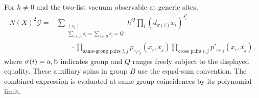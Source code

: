 \begin{theorem}\label{j:finite-spin-formula}
For $h\ne0$ and the two-list vacuum observable at generic sites,
\begin{equation}\label{j:finite-spin-sum}
\begin{aligned}
N(X)^2\mathscr G
 ={}&\sum_{\substack{(s_i)\\ \sum_{i\in A}s_i=\sum_{i\in B}s_i=Q}}
 h^Q \prod_i (d_{\sigma(i)}x_i)^{s_i^2}\\
 &\qquad\cdot\prod_{\text{same-group pairs }i,j}p_{s_i s_j}(x_i,x_j)
 \prod_{\text{cross pairs }i,j}p'_{s_i s_j}(x_i,x_j),
\end{aligned}
\end{equation}
where $\sigma(i)={\rm a},{\rm b}$ indicates group and $Q$ ranges freely
subject to the displayed equality. These auxiliary spins in group $B$
use the equal-sum convention. The combined expression is evaluated
at same-group coincidences by its polynomial limit.
\end{theorem}
